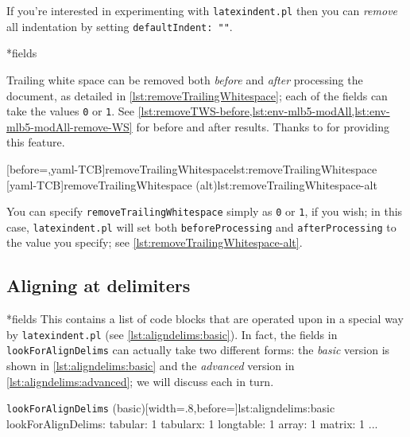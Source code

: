  If you're interested in experimenting with \texttt{latexindent.pl} then you can
 \emph{remove} all indentation by setting \texttt{defaultIndent: ""}.

*{fields}\label{yaml:removeTrailingWhitespace}

 Trailing white space can be removed both \emph{before} and \emph{after} processing the
 document, as detailed in \cref{lst:removeTrailingWhitespace}; each of the fields can take
 the values \texttt{0} or \texttt{1}. See
 \vref{lst:removeTWS-before,lst:env-mlb5-modAll,lst:env-mlb5-modAll-remove-WS} for before
 and after results. Thanks to \cite{vosskuhle} for providing this feature.

 \begin{cmhtcbraster}
  [before=\centering,yaml-TCB]{removeTrailingWhitespace}{lst:removeTrailingWhitespace}
  [yaml-TCB]{removeTrailingWhitespace (alt)}{lst:removeTrailingWhitespace-alt}
 \end{cmhtcbraster}

 You can specify \texttt{removeTrailingWhitespace} simply as \texttt{0} or \texttt{1}, if
 you wish; in this case, 
 \texttt{latexindent.pl} will set both \texttt{beforeProcessing} and
 \texttt{afterProcessing} to the value you specify; see
 \cref{lst:removeTrailingWhitespace-alt}.%

\subsection{Aligning at delimiters}\label{subsec:align-at-delimiters}
*{fields}
 This contains a list of code blocks that are operated upon in a special way by
 \texttt{latexindent.pl} (see \cref{lst:aligndelims:basic}). In fact, the fields in
 \texttt{lookForAlignDelims} can actually take two different forms: the \emph{basic}
 version is shown in \cref{lst:aligndelims:basic} and the \emph{advanced} version in
 \cref{lst:aligndelims:advanced}; we will discuss each in turn. 

 \begin{yaml}[numbers=none]{\texttt{lookForAlignDelims} (basic)}[width=.8\linewidth,before=\centering]{lst:aligndelims:basic}
lookForAlignDelims:
   tabular: 1
   tabularx: 1
   longtable: 1
   array: 1
   matrix: 1
   ...
	\end{yaml}

